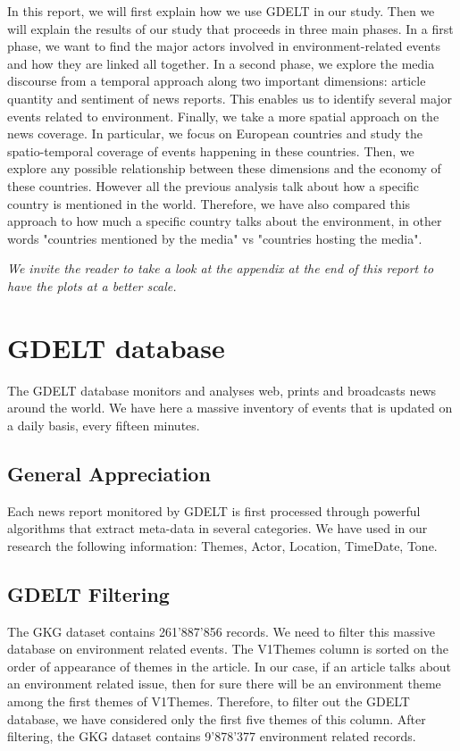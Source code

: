 \documentclass[11pt]{article}
\begin{document}
In this report, we will first explain how we use GDELT in our study. Then we will explain the results of our study that proceeds in three main phases. 
In a first phase, we want to find the major actors involved in environment-related events and how they are linked all together. 
In a second phase, we explore the media discourse from a temporal approach along two important dimensions: article quantity and sentiment of news reports. This enables us to identify several major events related to environment. 
Finally, we take a more spatial approach on the news coverage. In particular, we focus on European countries and study the spatio-temporal coverage of events happening in these countries. Then, we explore any possible relationship between these dimensions and the economy of these countries. However all the previous analysis talk about how a specific country is mentioned in the world. Therefore, we have also compared this approach to how much a specific country talks about the environment, in other words "countries mentioned by the media" vs "countries hosting the media".

\emph{We invite the reader to take a look at the appendix at the end of this report to have the plots at a better scale.}

\section{GDELT database}
The GDELT database monitors and analyses web, prints and broadcasts news around the world. We have here a massive inventory of events that is updated on a daily basis, every fifteen minutes. 

\subsection{General Appreciation}
Each news report monitored by GDELT is first processed through powerful algorithms that extract meta-data in several categories. We have used in our research the following information: Themes, Actor, Location, TimeDate, Tone.
\subsection{GDELT Filtering}

The GKG dataset contains 261'887'856 records.
We need to filter this massive database on environment related events. The V1Themes column is sorted on the order of appearance of themes in the article. In our case, if an article talks about an environment related issue, then for sure there will be an environment theme among the first themes of V1Themes. Therefore, to filter out the GDELT database, we have considered only the first five themes of this column. 
After filtering, the GKG dataset contains 9'878'377 environment related records.
\end{document}

